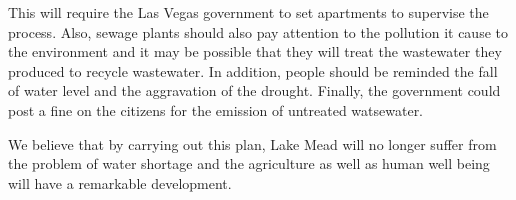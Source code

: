 \documentclass[12pt]{article}
\newcommand{\wholepages}{19}
\theoremstyle{definition}
\theoremstyle{remark}
\numberwithin{equation}{section}
\begin{document}
	This will require the Las Vegas government to set apartments to supervise the process. Also, sewage plants should also pay attention to the pollution it cause to the environment and it may be possible that they will treat the wastewater they produced to recycle wastewater. In addition, people should be reminded the fall of water level and the aggravation of the drought. Finally, the government could post a fine on the citizens for the emission of untreated watsewater.

	We believe that by carrying out this plan, Lake Mead will no longer suffer from the problem of water shortage and the agriculture as well as human well being will have a remarkable development.

\newpage
\thispagestyle{empty}
\renewcommand\refname{Reference}
\clearpage
{}
\end{document}
